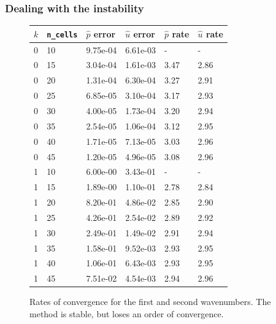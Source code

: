 \documentclass[8pt]{beamer}
\begin{document}
\begin{frame}
    \frametitle{Dealing with the instability}
    \begin{figure}
        \centering
        \begin{tabular}{| l | l | l | l | l | l |}
            \hline
            \(k\) & \texttt{n\_cells} &
            \(\hat{p}\) error & \(\hat{u}\) error &
            \(\hat{p}\) rate & \(\hat{u}\) rate                               \\
            \hline
            0 & 10 & 9.75e-04 & 6.61e-03 & - & -                              \\
            0 & 15 & 3.04e-04 & 1.61e-03 & 3.47 & 2.86                        \\
            0 & 20 & 1.31e-04 & 6.30e-04 & 3.27 & 2.91                        \\
            0 & 25 & 6.85e-05 & 3.10e-04 & 3.17 & 2.93                        \\
            0 & 30 & 4.00e-05 & 1.73e-04 & 3.20 & 2.94                        \\
            0 & 35 & 2.54e-05 & 1.06e-04 & 3.12 & 2.95                        \\
            0 & 40 & 1.71e-05 & 7.13e-05 & 3.03 & 2.96                        \\
            0 & 45 & 1.20e-05 & 4.96e-05 & 3.08 & 2.96                        \\
            \hline
            1 & 10 & 6.00e-00 & 3.43e-01 & -    & -                           \\
            1 & 15 & 1.89e-00 & 1.10e-01 & 2.78 & 2.84                        \\
            1 & 20 & 8.20e-01 & 4.86e-02 & 2.85 & 2.90                        \\
            1 & 25 & 4.26e-01 & 2.54e-02 & 2.89 & 2.92                        \\
            1 & 30 & 2.49e-01 & 1.49e-02 & 2.91 & 2.94                        \\
            1 & 35 & 1.58e-01 & 9.52e-03 & 2.93 & 2.95                        \\
            1 & 40 & 1.06e-01 & 6.43e-03 & 2.93 & 2.95                        \\
            1 & 45 & 7.51e-02 & 4.54e-03 & 2.94 & 2.96                        \\
            \hline
        \end{tabular}

        \caption{Rates of convergence for the first and second wavenumbers. The
        method is stable, but loses an order of convergence.}
    \end{figure}
\end{frame}
\end{document}
